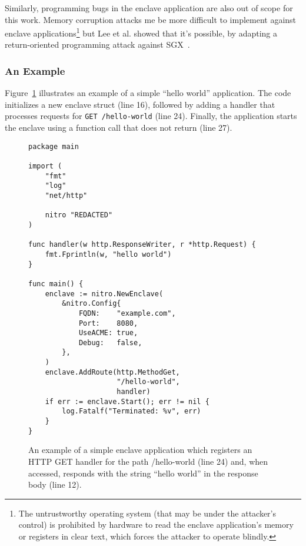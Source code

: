 Similarly, programming bugs in the enclave application are also out of scope
for this work.  Memory corruption attacks me be more difficult to implement
against enclave applications\footnote{The untrustworthy operating system (that
may be under the attacker's control) is prohibited by hardware to read the
enclave application's memory or registers in clear text, which forces the
attacker to operate blindly.} but Lee et al. showed that it's possible, by
adapting a return-oriented programming attack against SGX~\cite{Lee2017a}.

\subsubsection{An Example}

Figure~\ref{fig:hello-world} illustrates an example of a simple ``hello world''
application.  The code initializes a new enclave struct (line 16), followed by
adding a handler that processes requests for \texttt{GET /hello-world} (line
24).  Finally, the application starts the enclave using a function call that
does not return (line 27).

\begin{figure}[t]
\begin{lstlisting}
package main

import (
    "fmt"
    "log"
    "net/http"

    nitro "REDACTED"
)

func handler(w http.ResponseWriter, r *http.Request) {
    fmt.Fprintln(w, "hello world")
}

func main() {
    enclave := nitro.NewEnclave(
        &nitro.Config{
            FQDN:    "example.com",
            Port:    8080,
            UseACME: true,
            Debug:   false,
        },
    )
    enclave.AddRoute(http.MethodGet,
                     "/hello-world",
                     handler)
    if err := enclave.Start(); err != nil {
        log.Fatalf("Terminated: %v", err)
    }
}
\end{lstlisting}
\caption{An example of a simple enclave application which registers an HTTP GET
  handler for the path /hello-world (line 24) and, when accessed, responds with
  the string ``hello world'' in the response body (line 12).}
\label{fig:hello-world}
\end{figure}
